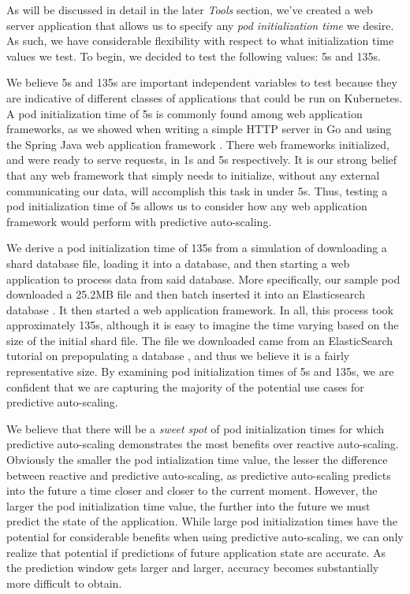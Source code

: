 As will be discussed in detail in the later \textit{Tools} section, we've created a web
server application that allows us to specify any \textit{pod
initialization time} we desire. As such, we have considerable flexibility with
respect to what initialization time values we test. To begin, we decided to test the
following values: 5s and 135s.

We believe 5s and 135s are important independent variables to test because they
are indicative of different classes of applications that could be run on
Kubernetes. A pod initialization time of 5s is commonly found among web
application frameworks, as we showed when writing a simple HTTP server in Go and
using the Spring Java web application framework \cite{spring}. There web
frameworks initialized, and were ready to serve requests, in 1s and 5s
respectively. It is our strong belief that any web framework that simply
needs to initialize, without any external communicating our data, will
accomplish this task in under 5s. Thus, testing a pod initialization time of 5s
allows us to consider how any web application framework would perform with
predictive auto-scaling.

We derive a pod initialization time of 135s from a simulation of downloading a
shard database file, loading it into a database, and then starting a web
application to process data from said database. More specifically, our sample
pod downloaded a 25.2MB file and then batch inserted it into an Elasticsearch
database \cite{elasticsearch}. It then started a web application framework. In
all, this process took approximately 135s, although it is easy to imagine the
time varying based on the size of the initial shard file. The file we downloaded
came from an ElasticSearch tutorial on prepopulating a database
\cite{elasticsearch-import-some-data}, and thus we believe it is a fairly
representative size. By examining pod initialization times of 5s and 135s, we
are confident that we are capturing the majority of the potential use cases for
predictive auto-scaling.

We believe that there will be a \textit{sweet spot} of pod initialization times
for which predictive auto-scaling demonstrates the most benefits over reactive
auto-scaling. Obviously the smaller the pod intialization time value, the lesser
the difference between reactive and predictive auto-scaling, as predictive
auto-scaling predicts into the future a time closer and closer to the current
moment. However, the larger the pod initialization time value, the further into
the future we must predict the state of the application. While large pod
initialization times have the potential for considerable benefits when using
predictive auto-scaling, we can only realize that potential if predictions of
future application state are accurate. As the prediction window gets larger and
larger, accuracy becomes substantially more difficult to obtain.
